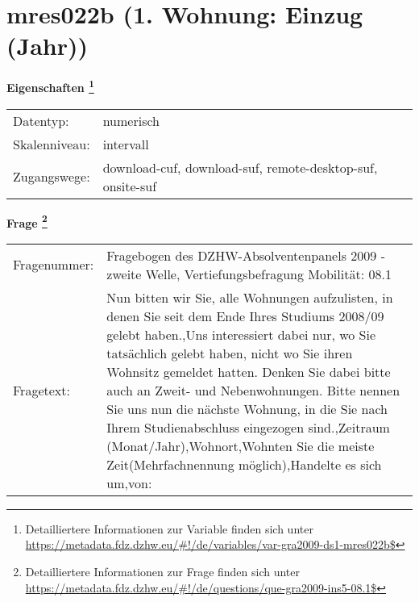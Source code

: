 
    \setcounter{footnote}{0}

    \vspace*{-1.8cm}
	\section{mres022b (1. Wohnung: Einzug (Jahr))}
	\label{section:mres022b}



    \vspace*{0.5cm}
    \noindent\textbf{Eigenschaften
	\footnote{Detailliertere Informationen zur Variable finden sich unter
		\url{https://metadata.fdz.dzhw.eu/\#!/de/variables/var-gra2009-ds1-mres022b$}}}\\
	\begin{tabularx}{\hsize}{@{}lX}
	Datentyp: & numerisch \\
	Skalenniveau: & intervall \\
	Zugangswege: &
	  download-cuf, 
	  download-suf, 
	  remote-desktop-suf, 
	  onsite-suf
 \\
    \end{tabularx}



				\vspace*{0.5cm}
                \noindent\textbf{Frage
	                \footnote{Detailliertere Informationen zur Frage finden sich unter
		              \url{https://metadata.fdz.dzhw.eu/\#!/de/questions/que-gra2009-ins5-08.1$}}}\\
				\begin{tabularx}{\hsize}{@{}lX}
					Fragenummer: &
					  Fragebogen des DZHW-Absolventenpanels 2009 - zweite Welle, Vertiefungsbefragung Mobilität:
					  08.1
 \\
					Fragetext: & Nun bitten wir Sie, alle Wohnungen aufzulisten, in denen Sie seit dem Ende Ihres Studiums 2008/09 gelebt haben.,Uns interessiert dabei nur, wo Sie tatsächlich gelebt haben, nicht wo Sie ihren Wohnsitz gemeldet hatten. Denken Sie dabei bitte auch an Zweit- und Nebenwohnungen. Bitte nennen Sie uns nun die nächste Wohnung, in die Sie nach Ihrem Studienabschluss eingezogen sind.,Zeitraum (Monat/Jahr),Wohnort,Wohnten Sie die meiste Zeit(Mehrfachnennung möglich),Handelte es sich um,von: \\
				\end{tabularx}






